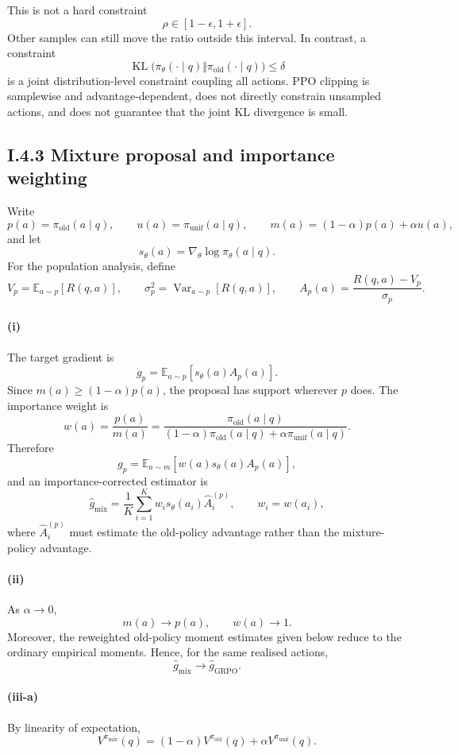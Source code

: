 \documentclass[11pt]{article}
\begin{document}
This is not a hard constraint
\[
\rho\in[1-\epsilon,1+\epsilon].
\]
Other samples can still move the ratio outside this interval. In contrast, a
constraint
\[
\operatorname{KL}
\bigl(
\pi_\theta(\cdot\mid q)
\Vert
\pi_{\mathrm{old}}(\cdot\mid q)
\bigr)
\leq\delta
\]
is a joint distribution-level constraint coupling all actions. PPO clipping is
samplewise and advantage-dependent, does not directly constrain unsampled
actions, and does not guarantee that the joint KL divergence is small.


\subsection*{I.4.3 Mixture proposal and importance weighting}

Write
\[
p(a)=\pi_{\mathrm{old}}(a\mid q),
\qquad
u(a)=\pi_{\mathrm{unif}}(a\mid q),
\qquad
m(a)=(1-\alpha)p(a)+\alpha u(a),
\]
and let
\[
s_\theta(a)=\nabla_\theta\log\pi_\theta(a\mid q).
\]
For the population analysis, define
\[
V_p=\mathbb{E}_{a\sim p}[R(q,a)],
\qquad
\sigma_p^2=\operatorname{Var}_{a\sim p}[R(q,a)],
\qquad
A_p(a)=\frac{R(q,a)-V_p}{\sigma_p}.
\]

\paragraph{(i)}
The target gradient is
\[
g_p
=
\mathbb{E}_{a\sim p}[s_\theta(a)A_p(a)].
\]
Since $m(a)\geq(1-\alpha)p(a)$, the proposal has support wherever $p$ does.
The importance weight is
\[
\boxed{
w(a)
=
\frac{p(a)}{m(a)}
=
\frac{
\pi_{\mathrm{old}}(a\mid q)
}{
(1-\alpha)\pi_{\mathrm{old}}(a\mid q)
+\alpha\pi_{\mathrm{unif}}(a\mid q)
}.
}
\]
Therefore
\[
g_p
=
\mathbb{E}_{a\sim m}
\left[
w(a)s_\theta(a)A_p(a)
\right],
\]
and an importance-corrected estimator is
\[
\boxed{
\hat g_{\mathrm{mix}}
=
\frac{1}{K}
\sum_{i=1}^K
w_i s_\theta(a_i)\hat A_i^{(p)},
\qquad
w_i=w(a_i),
}
\]
where $\hat A_i^{(p)}$ must estimate the old-policy advantage rather than the
mixture-policy advantage.

\paragraph{(ii)}
As $\alpha\to0$,
\[
m(a)\to p(a),
\qquad
w(a)\to1.
\]
Moreover, the reweighted old-policy moment estimates given below reduce to the
ordinary empirical moments. Hence, for the same realised actions,
\[
\boxed{
\hat g_{\mathrm{mix}}\longrightarrow\hat g_{\mathrm{GRPO}}.
}
\]

\paragraph{(iii-a)}
By linearity of expectation,
\[
\boxed{
V^{\pi_{\mathrm{mix}}}(q)
=
(1-\alpha)V^{\pi_{\mathrm{old}}}(q)
+
\alpha V^{\pi_{\mathrm{unif}}}(q).
}
\]
\end{document}
